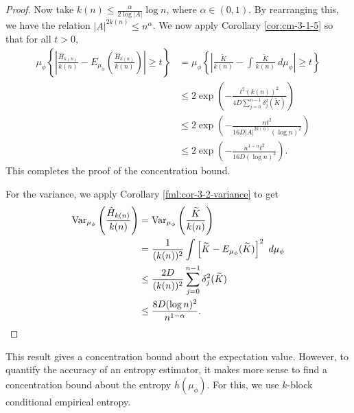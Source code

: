 \begin{theorem}
\begin{proof}
		Now take $k(n) \leq \frac{\alpha}{2\log{|A|}}\log{n}$, where $\alpha \in (0, 1)$. By rearranging this, we have the relation $|A|^{2k(n)} \leq n^\alpha$. We now apply Corollary \ref{cor:cm-3-1-5} so that for all $t > 0$,
		\begin{align*}
			\mu_\phi\left\{\left| \frac{\hat{H}_{k(n)}}{k(n)} - E_{\mu_\phi}\left(\frac{\hat{H}_{k(n)}}{k(n)}\right) \right| \geq t\right\} &= \mu_\phi\left\{\left| \frac{\tilde{K}}{k(n)} - \int{\frac{\tilde{K}}{k(n)}\ d\mu_\phi} \right| \geq t\right\} \\
				&\leq 2\exp\left(-\frac{t^2 (k(n))^2}{4D\sum_{j = 0}^{n - 1}{\delta_j^2(\tilde{K})}}\right) \\
				&\leq 2\exp\left(-\frac{nt^2}{16D|A|^{2k(n)} (\log{n})^2}\right) \\
				&\leq 2\exp\left(-\frac{n^{1 - \alpha} t^2}{16D (\log{n})^2}\right).
		\end{align*}
		This completes the proof of the concentration bound.
		
		For the variance, we apply Corollary \ref{fml:cor-3-2-variance} to get
		\begin{align*}
			\operatorname{Var}_{\mu_\phi}\left(\frac{\hat{H}_{k(n)}}{k(n)}\right) &= \operatorname{Var}_{\mu_\phi}\left(\frac{\widetilde{K}}{k(n)}\right) \\
				&= \frac{1}{(k(n))^2}\int{\left[\widetilde{K} - E_{\mu_\phi}(\widetilde{K})\right]^2\ d\mu_\phi} \\
				&\leq \frac{2D}{(k(n))^2}\sum_{j = 0}^{n - 1}{\delta_j^2(\widetilde{K})} \\
				&\leq \frac{8D (\log{n})^2}{n^{1 - \alpha}}.
		\end{align*}
	\end{proof}
\end{theorem}

This result gives a concentration bound about the expectation value. However, to quantify the accuracy of an entropy estimator, it makes more sense to find a concentration bound about the entropy $h(\mu_\phi)$. For this, we use $k$-block conditional empirical entropy.

